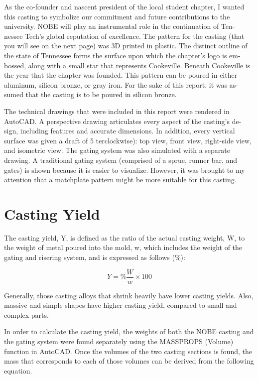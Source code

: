 \documentclass{article}
\begin{document}
As  the  co-founder  and  nascent  president  of  the  local  student  chapter,  I
wanted this casting to symbolize our commitment and future contributions to
the university.  NOBE will play an instrumental role in the continuation of Ten-
nessee Tech's global reputation of excellence.  The pattern for the casting (that
you will see on the next page) was 3D printed in plastic.  The distinct outline of
the state of Tennessee forms the surface upon which the chapter's logo is em-
bossed, along with a small star that represents Cookeville.  Beneath Cookeville
is the year that the chapter was founded.  This pattern can be poured in either
aluminum, silicon bronze, or gray iron.  For the sake of this report, it was as-
sumed that the casting is to be poured in silicon bronze.

The technical drawings that were included in this report were rendered in
AutoCAD. A perspective drawing articulates every aspect of the casting's de-
sign,  including  features  and  accurate  dimensions.   In  addition,  every  vertical
surface was given a draft of 5%
terclockwise):  top view,  front view,  right-side view,  and isometric view.  The
gating system was also simulated with a separate drawing.  A traditional gating
system  (comprised  of  a  sprue,  runner  bar,  and  gates)  is  shown  because  it  is
easier to visualize.  However, it was brought to my attention that a matchplate
pattern might be more suitable for this casting.

\section{Casting Yield}

The casting yield, Y, is defined as the ratio of the actual casting weight, W, to the weight of metal poured into the mold, w, which includes the weight of the gating and risering system, and is expressed as follows (\%): \cite{LerRao} 

\begin{equation}
Y = \% \frac{W}{w} \times 100
\end{equation}

Generally, those casting alloys that shrink heavily have lower casting yields. Also, massive and simple shapes have higher casting yield, compared to small and complex parts. \cite{LerRao} 

In order to calculate the casting yield, the weights of both the NOBE casting and the gating system were found separately using the MASSPROPS (Volume) function in AutoCAD. Once the volumes of the two casting sections is found, the mass that corresponds to each of those volumes can be derived from the following equation.
\end{document}
